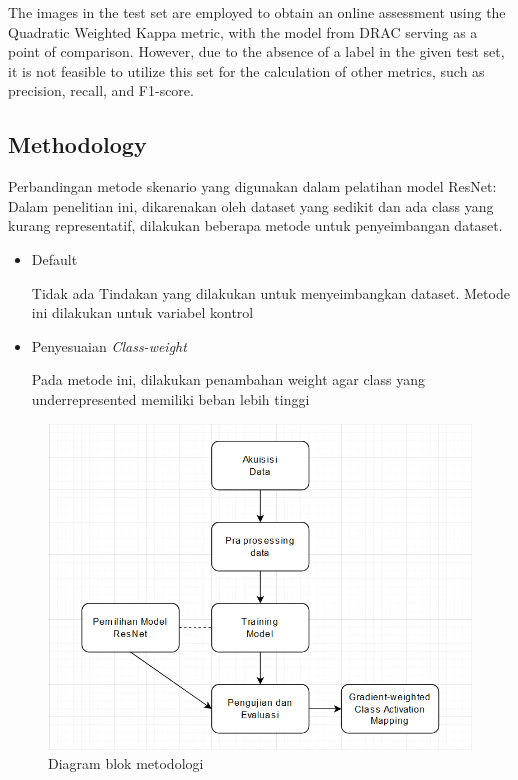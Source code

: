 The images in the test set are employed to obtain an online assessment using the Quadratic Weighted Kappa metric, with the model from DRAC serving as a point of comparison. However, due to the absence of a label in the given test set, it is not feasible to utilize this set for the calculation of other metrics, such as precision, recall, and F1-score.

\subsection{Methodology}
\label{subsec:loremipsum}

Perbandingan metode skenario yang digunakan dalam pelatihan model ResNet:
Dalam penelitian ini, dikarenakan oleh dataset yang sedikit dan ada class yang kurang representatif, dilakukan beberapa metode untuk penyeimbangan dataset.
\begin{itemize}
	\item Default
	
	Tidak ada Tindakan yang dilakukan untuk menyeimbangkan dataset. Metode ini dilakukan untuk variabel kontrol
	\item Penyesuaian \emph{Class-weight}
	
	Pada metode ini, dilakukan penambahan weight agar class yang underrepresented memiliki beban lebih tinggi
\end{itemize}

\begin{figure}[hbtp] \centering
	\includegraphics[scale=0.5]{gambar/diagramMethod.png}
	\caption{Diagram blok metodologi}
	\label{fig:diagramMethod}
\end{figure}

